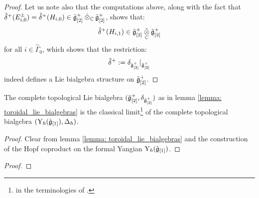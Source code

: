 \begin{proof}
                    Let us note also that the computations above, along with the fact that $\hat{\delta}^+(E_{i, 0}^{\pm}) = \hat{\delta}^+(H_{i, 0}) \in \tilde{\g}_{[2]}^+ \hattensor_{\bbC} \tilde{\g}_{[2]}^+$, shows that:
                        $$\hat{\delta}^+(H_{i, 1}) \in \tilde{\g}_{[2]}^+ \hattensor_{\bbC} \tilde{\g}_{[2]}^+$$
                    for all $i \in \hat{\Gamma}_0$, which shows that the restriction:
                        $$\tilde{\delta}^+ := \delta_{\hat{\mathfrak{g}}_{[2]}^+}|_{\tilde{\mathfrak{g}}_{[2]}^+}$$
                    indeed defines a Lie bialgebra structure on $\tilde{\mathfrak{g}}_{[2]}^+$.
                    
                \end{proof}
            \begin{theorem} \label{theorem: toroidal_lie_algebras_as_classical_limits_of_affine_yangians}
                The complete topological Lie bialgebra $(\tilde{\mathfrak{g}}_{[2]}^+, \delta_{\tilde{\mathfrak{g}}_{[2]}^+})$ as in lemma \ref{lemma: toroidal_lie_bialgebras} is the classical limit\footnote{ in the terminologies of \cite{etingof_kazhdan_quantisation_1}.} of the complete topological bialgebra $(\mathrm{Y}_{\hbar}(\hat{\mathfrak{g}}_{[1]}), \Delta_{\hbar})$.
            \end{theorem}
                \begin{proof}
                    Clear from lemma \ref{lemma: toroidal_lie_bialgebras} and the construction of the Hopf coproduct on the formal Yangian $\mathrm{Y}_{\hbar}(\hat{\mathfrak{g}}_{[1]})$. 
                \end{proof}
                
            \begin{definition} \label{def: parametrised_pseudo_quantisations}
                
            \end{definition}
            \begin{theorem} \label{theorem: parametrised_pseudo_classical_limits_of_affine_yangians}
                
            \end{theorem}
                \begin{proof}
                    
                \end{proof}

    \begin{appendices}
        
    
        
    \end{appendices}
            
    \printbibliography

